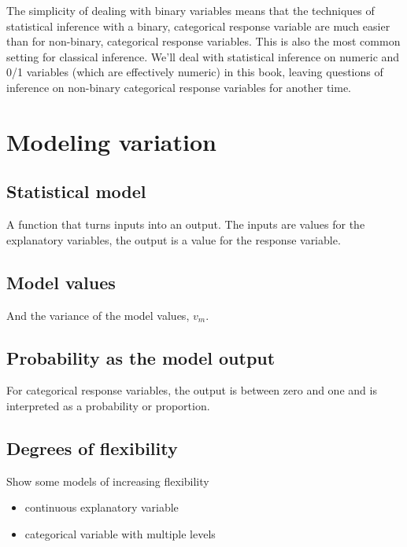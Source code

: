 \documentclass[]{book}
\providecommand{\tightlist}{%
  \setlength{\itemsep}{0pt}\setlength{\parskip}{0pt}}
\begin{document}
The simplicity of dealing with binary variables means that the techniques of statistical inference with a binary, categorical response variable are much easier than for non-binary, categorical response variables. This is also the most common setting for classical inference. We'll deal with statistical inference on numeric and 0/1 variables (which are effectively numeric) in this book, leaving questions of inference on non-binary categorical response variables for another time.

\hypertarget{modeling-variation}{%
\chapter{Modeling variation}\label{modeling-variation}}

\hypertarget{statistical-model}{%
\section{Statistical model}\label{statistical-model}}

A function that turns inputs into an output. The inputs are values for the explanatory variables, the output is a value for the response variable.

\hypertarget{model-values}{%
\section{Model values}\label{model-values}}

And the variance of the model values, \(v_m\).

\hypertarget{probability-as-the-model-output}{%
\section{Probability as the model output}\label{probability-as-the-model-output}}

For categorical response variables, the output is between zero and one and is interpreted as a probability or proportion.

\hypertarget{degrees-of-flexibility}{%
\section{Degrees of flexibility}\label{degrees-of-flexibility}}

Show some models of increasing flexibility

\begin{itemize}
\tightlist
\item
  continuous explanatory variable
\item
  categorical variable with multiple levels
\end{itemize}
\end{document}
